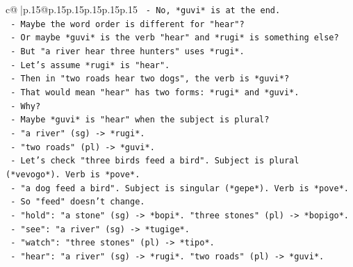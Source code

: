 \documentclass{article}
\begin{document}
{\begin{supertabular}{c@{$\;$}|p{.15\linewidth}@{}p{.15\linewidth}p{.15\linewidth}p{.15\linewidth}p{.15\linewidth}p{.15\linewidth}}
{{{\texttt{                                               {-} No, *guvi* is at the end.} \\
\texttt{                                               {-} Maybe the word order is different for "hear"?} \\
\texttt{                                               {-} Or maybe *guvi* is the verb "hear" and *rugi* is something else?} \\
\texttt{                                               {-} But "a river hear three hunters" uses *rugi*.} \\
\texttt{                                               {-} Let's assume *rugi* is "hear".} \\
\texttt{                                               {-} Then in "two roads hear two dogs", the verb is *guvi*?} \\
\texttt{                                               {-} That would mean "hear" has two forms: *rugi* and *guvi*.} \\
\texttt{                                               {-} Why?} \\
\texttt{                                               {-} Maybe *guvi* is "hear" when the subject is plural?} \\
\texttt{                                               {-} "a river" (sg) {-}> *rugi*.} \\
\texttt{                                               {-} "two roads" (pl) {-}> *guvi*.} \\
\texttt{                                               {-} Let's check "three birds feed a bird". Subject is plural (*vevogo*). Verb is *pove*.} \\
\texttt{                                               {-} "a dog feed a bird". Subject is singular (*gepe*). Verb is *pove*.} \\
\texttt{                                               {-} So "feed" doesn't change.} \\
\texttt{                                               {-} "hold": "a stone" (sg) {-}> *bopi*. "three stones" (pl) {-}> *bopigo*.} \\
\texttt{                                               {-} "see": "a river" (sg) {-}> *tugige*.} \\
\texttt{                                               {-} "watch": "three stones" (pl) {-}> *tipo*.} \\
\texttt{                                               {-} "hear": "a river" (sg) {-}> *rugi*. "two roads" (pl) {-}> *guvi*.} \\
}}}
\end{supertabular}}
\end{document}
